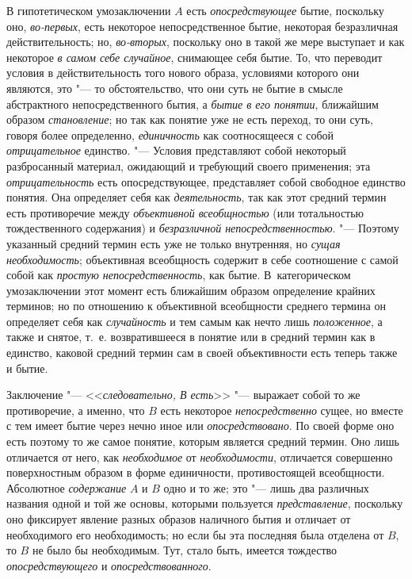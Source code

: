 {{В гипотетическом умозаключении $A$ есть
{\em опосредствующее} бытие, поскольку оно, {\em во-первых}, есть
некоторое непосредственное бытие, некоторая безразличная действительность;
но, {\em во-вторых}, поскольку оно в такой же мере выступает и как некоторое
{\em в самом себе случайное},
снимающее себя бытие. То, что переводит условия в
действительность того нового образа, условиями которого они являются, это
"--- то обстоятельство, что они суть не бытие в смысле
абстрактного непосредственного бытия, а
{\em бытие в его понятии}, ближайшим образом {\em становление}; но так
как понятие уже не есть переход, то они суть, говоря более определенно,
{\em единичность} как
соотносящееся с собой {\em отрицательное} единство. "--- Условия
представляют собой некоторый разбросанный материал,
ожидающий и требующий своего применения; эта {\em отрицательность}
есть опосредствующее, представляет собой свободное единство
понятия. Она определяет себя как {\em деятельность}, так
как этот средний термин есть противоречие между
{\em объективной всеобщностью}
(или тотальностью тождественного содержания) и
{\em безразличной непосредственностью}.
"--- Поэтому указанный средний термин есть уже не только
внутренняя, но {\em сущая
необходимость}; объективная всеобщность содержит в себе
соотношение с самой собой как {\em простую непосредственность},
как бытие. В~категорическом умозаключении этот момент есть
ближайшим образом определение крайних терминов; но по отношению к
объективной всеобщности среднего термина он определяет себя как
{\em случайность} и тем самым как нечто лишь {\em положенное},
а также и снятое, т.~е. возвратившееся в понятие или в
средний термин как в единство, каковой средний термин сам в своей
объективности есть теперь также и бытие.

Заключение "--- <<{\em следовательно, В есть}>>
"--- выражает собой то же противоречие, а именно, что
$B$ есть некоторое {\em непосредственно}
сущее, но вместе с тем имеет бытие через нечно иное или
{\em опосредствовано}.
По своей форме оно есть поэтому то же самое понятие, которым
является средний термин. Оно лишь отличается от него, как
{\em необходимое} от {\em необходимости},
отличается совершенно поверхностным образом в форме
единичности, противостоящей всеобщности. Абсолютное
{\em содержание} $A$ и $B$ одно и то же;
это "--- лишь два различных названия одной и той же основы,
которыми пользуется {\em представление},
поскольку оно фиксирует явление разных образов наличного
бытия и отличает от необходимого его необходимость; но если бы эта
последняя была отделена от $B$, то $B$ не было бы необходимым.
Тут, стало быть, имеется тождество {\em опосредствующего} и
{\em опосредствованного}.

}}
